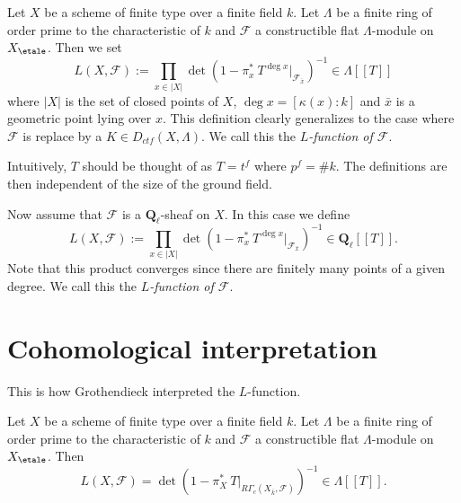 \begin{definition}
\label{definition-L-function-finite-ring}
Let $X$ be a scheme of finite type over a finite field $k$. Let $\Lambda$ be a
finite ring of order prime to the characteristic of $k$ and $\mathcal{F}$ a
constructible flat $\Lambda$-module on $X_\etale$. Then we set
$$
L(X, \mathcal{F}) := \prod_{x\in |X|}\det\left(1-\pi_x^*\ T^{\deg
x}\Big|_{\mathcal{F}_{\bar x}}\right)^{-1}\in \Lambda [[ T ]]
$$
where $|X|$ is the set of closed points of $X$, $\deg x = [\kappa(x): k]$ and
$\bar x$ is a geometric point lying over $x$. This definition clearly
generalizes to the case where $\mathcal{F}$ is replace by a
$K \in D_{ctf}(X, \Lambda)$. We call this the {\it $L$-function of
$\mathcal{F}$}.
\end{definition}

\begin{remark}
\label{remark-T}
Intuitively, $T$ should be thought of as $T = t^f$ where $p^f = \# k$. The
definitions are then independent of the size of the ground field.
\end{remark}

\begin{definition}
\label{definition-L-function-l-adic}
Now assume that $\mathcal{F}$ is a $\mathbf{Q}_\ell$-sheaf on $X$.
In this case we define
$$
L(X, \mathcal{F}) := \prod_{x\in |X|}\det\left(1-\pi_x^*\ T^{\deg
x}\Big|_{\mathcal{F}_{\bar x}}\right)^{-1}\in \mathbf{Q}_\ell [[ T ]].
$$
Note that this product converges since there are finitely many points of a
given degree. We call this the {\it $L$-function of
$\mathcal{F}$}.
\end{definition}




\section{Cohomological interpretation}
\label{section-L-cohomological}

\noindent
This is how Grothendieck interpreted the $L$-function.

\begin{theorem}
\label{theorem-A}
Let $X$ be a scheme of finite type over a finite field $k$. Let $\Lambda$ be a
finite ring of order prime to the characteristic of $k$ and $\mathcal{F}$ a
constructible flat $\Lambda$-module on $X_\etale$. Then
$$
L(X, \mathcal{F}) = \det\left(1-\pi_X^*\ T\Big|_{R\Gamma_c(X_{\bar k},
\mathcal{F})}\right)^{-1}\in \Lambda[[ T]].
$$
\end{theorem}


